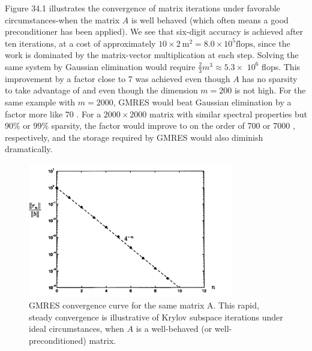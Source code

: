 \begin{example}
Figure 34.1 illustrates the convergence of matrix iterations under favorable circumstances-when the matrix $A$ is well behaved (which often means a good preconditioner has been applied). We see that six-digit accuracy is achieved after ten iterations, at a cost of approximately $10 \times 2 \mathrm{~m}^2=8.0 \times 10^5 \mathrm{flops}$, since the work is dominated by the matrix-vector multiplication at each step. Solving the same system by Gaussian elimination would require $\frac{2}{3} m^3 \approx 5.3 \times$ $10^6$ flops. This improvement by a factor close to 7 was achieved even though $A$ has no sparsity to take advantage of and even though the dimension $m=200$ is not high. For the same example with $m=2000$, GMRES would beat Gaussian elimination by a factor more like 70 . For a $2000 \times 2000$ matrix with similar spectral properties but $90 \%$ or $99 \%$ sparsity, the factor would improve to on the order of 700 or 7000 , respectively, and the storage required by GMRES would also diminish dramatically.
\begin{figure}[H]
    \centering
    \includegraphics[width=0.8\textwidth]{figures/35-3.png}
    \caption{GMRES convergence curve for the same matrix A. This rapid, steady convergence is illustrative of Krylov subspace iterations under ideal circumstances, when $A$ is a well-behaved (or well-preconditioned) matrix.}
\end{figure}
\end{example}


